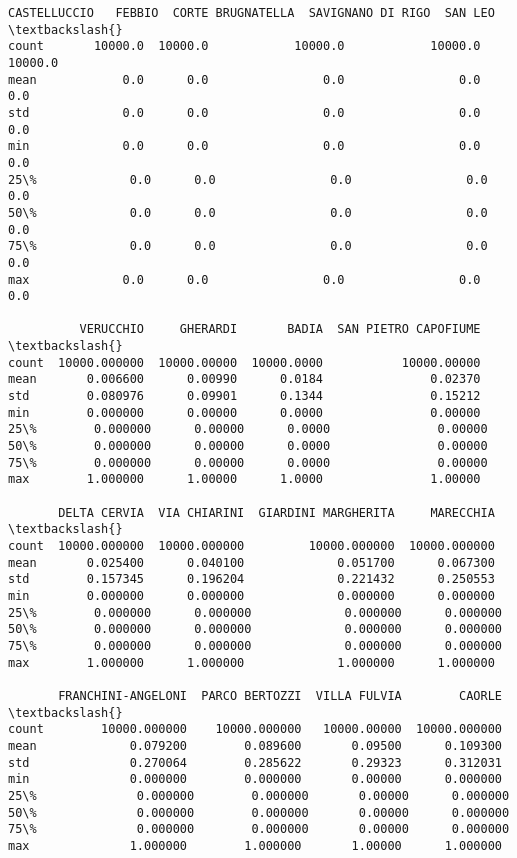 \documentclass[11pt]{article}
\makeatletter
\newcommand{\boxspacing}{\kern\kvtcb@left@rule\kern\kvtcb@boxsep}
\newcommand{\prompt}[4]{
        {\ttfamily\llap{{\color{#2}[#3]:\hspace{3pt}#4}}\vspace{-\baselineskip}}
    }
\makeatother
\begin{document}
            \begin{tcolorbox}[breakable, size=fbox, boxrule=.5pt, pad at break*=1mm, opacityfill=0]
\prompt{Out}{outcolor}{23}{\boxspacing}
\begin{Verbatim}[commandchars=\\\{\}]
       CASTELLUCCIO   FEBBIO  CORTE BRUGNATELLA  SAVIGNANO DI RIGO  SAN LEO  \textbackslash{}
count       10000.0  10000.0            10000.0            10000.0  10000.0
mean            0.0      0.0                0.0                0.0      0.0
std             0.0      0.0                0.0                0.0      0.0
min             0.0      0.0                0.0                0.0      0.0
25\%             0.0      0.0                0.0                0.0      0.0
50\%             0.0      0.0                0.0                0.0      0.0
75\%             0.0      0.0                0.0                0.0      0.0
max             0.0      0.0                0.0                0.0      0.0

          VERUCCHIO     GHERARDI       BADIA  SAN PIETRO CAPOFIUME  \textbackslash{}
count  10000.000000  10000.00000  10000.0000           10000.00000
mean       0.006600      0.00990      0.0184               0.02370
std        0.080976      0.09901      0.1344               0.15212
min        0.000000      0.00000      0.0000               0.00000
25\%        0.000000      0.00000      0.0000               0.00000
50\%        0.000000      0.00000      0.0000               0.00000
75\%        0.000000      0.00000      0.0000               0.00000
max        1.000000      1.00000      1.0000               1.00000

       DELTA CERVIA  VIA CHIARINI  GIARDINI MARGHERITA     MARECCHIA  \textbackslash{}
count  10000.000000  10000.000000         10000.000000  10000.000000
mean       0.025400      0.040100             0.051700      0.067300
std        0.157345      0.196204             0.221432      0.250553
min        0.000000      0.000000             0.000000      0.000000
25\%        0.000000      0.000000             0.000000      0.000000
50\%        0.000000      0.000000             0.000000      0.000000
75\%        0.000000      0.000000             0.000000      0.000000
max        1.000000      1.000000             1.000000      1.000000

       FRANCHINI-ANGELONI  PARCO BERTOZZI  VILLA FULVIA        CAORLE  \textbackslash{}
count        10000.000000    10000.000000   10000.00000  10000.000000
mean             0.079200        0.089600       0.09500      0.109300
std              0.270064        0.285622       0.29323      0.312031
min              0.000000        0.000000       0.00000      0.000000
25\%              0.000000        0.000000       0.00000      0.000000
50\%              0.000000        0.000000       0.00000      0.000000
75\%              0.000000        0.000000       0.00000      0.000000
max              1.000000        1.000000       1.00000      1.000000


\end{Verbatim}
\end{tcolorbox}
\end{document}
